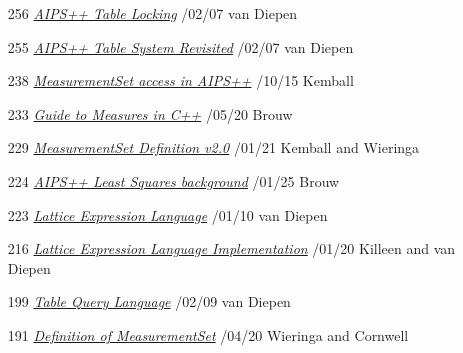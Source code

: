 %

\begin{enumerate}

\item[256]
\href{256.html}{\textit{AIPS++ Table Locking}}
/02/07 van Diepen

\item[255]
\href{255.html}{\textit{AIPS++ Table System Revisited}}
/02/07 van Diepen

\item[238]
\href{238.html}{\textit{MeasurementSet access in AIPS++}}
/10/15 Kemball

\item[233]
\href{233.html}{\textit{Guide to Measures in C++}}
/05/20 Brouw

\item[229]
\href{229.html}{\textit{MeasurementSet Definition v2.0}}
/01/21 Kemball and Wieringa

\item[224]
\href{224.html}{\textit{AIPS++ Least Squares background}}
/01/25 Brouw

\item[223]
\href{223.html}{\textit{Lattice Expression Language}}
/01/10 van Diepen

\item[216]
\href{216.html}{\textit{Lattice Expression Language Implementation}}
/01/20 Killeen and van Diepen

\item[199]
\href{199.html}{\textit{Table Query Language}}
/02/09 van Diepen

\item[191]
\href{191.html}{\textit{Definition of MeasurementSet}}
/04/20 Wieringa and Cornwell

\end{enumerate}
